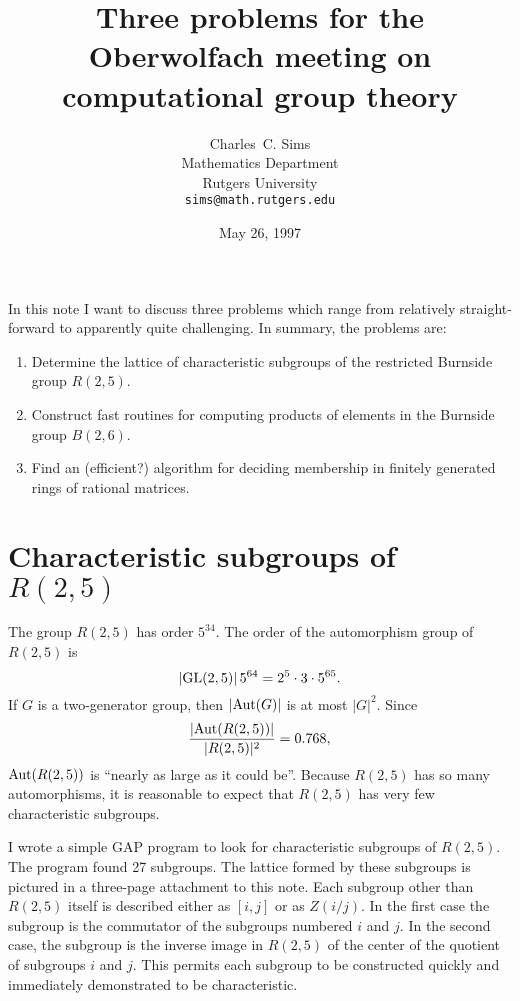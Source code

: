 \documentclass[12pt]{article}
\def\aut{{\rm Aut}}
\def\gl{{\rm GL}}
\begin{document}
\title{Three problems for the Oberwolfach meeting on\\
       computational group theory}
\author{Charles~C. Sims\\
        Mathematics Department\\
        Rutgers University\\
        \texttt{sims@math.rutgers.edu} }
\date{May 26, 1997}
\maketitle


In this note I want to discuss three problems which range from
relatively straight-forward to apparently quite challenging.  In
summary, the problems are:

\begin{enumerate}
   \item Determine the lattice of characteristic subgroups of the
    restricted Burnside group $R(2,5)$.
   \item Construct fast routines for computing products of elements
    in the Burnside group $B(2,6)$.
   \item Find an (efficient?) algorithm for deciding membership in
    finitely generated rings of rational matrices.
\end{enumerate}

\section{Characteristic subgroups of $R(2,5)$}
The group $R(2,5)$ has order $5^{34}$.  The order of the automorphism
group of $R(2,5)$ is
\[
|\gl(2,5)|\,5^{64} = 2^5\cdot3\cdot5^{65}.
\]
If $G$ is a two-generator group, then $|\aut(G)|$ is at most $|G|^2$.
Since
\[
\frac{|\aut(R(2,5))|}{|R(2,5)|^2} = 0.768,
\]
$\aut(R(2,5))$ is ``nearly as large as it could be''.  Because
$R(2,5)$ has so many automorphisms, it is reasonable to expect that
$R(2,5)$ has very few characteristic subgroups.

I wrote a simple GAP program to look for characteristic subgroups of
$R(2,5)$.  The program found 27 subgroups.  The lattice formed by
these subgroups is pictured in a three-page attachment to this note.
Each subgroup other than $R(2,5)$ itself is described either as
$[i,j]$ or as $Z(i/j)$.  In the first case the subgroup is the
commutator of the subgroups numbered $i$ and $j$.  In the second case,
the subgroup is the inverse image in $R(2,5)$ of the center of the
quotient of subgroups $i$ and $j$.  This permits each subgroup to be
constructed quickly and immediately demonstrated to be characteristic.
\end{document}
